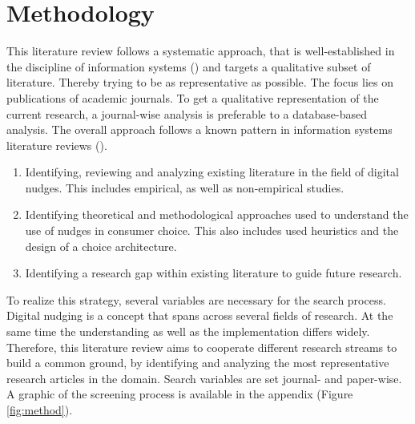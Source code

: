 \section{Methodology}
This literature review follows a systematic approach, that is well-established in the discipline of information systems (\cite{webster_analyzing_2002}) and targets a qualitative subset of literature. Thereby trying to be as representative as possible. The focus lies on publications of academic journals. To get a qualitative representation of the current research, a journal-wise analysis is preferable to a database-based analysis. The overall approach follows a known pattern in information systems literature reviews (\cite{alavi_review_1992}).
\begin{enumerate}
\item Identifying, reviewing and analyzing existing literature in the field of digital nudges. This includes empirical, as well as non-empirical studies.
\item Identifying theoretical and methodological approaches used to understand the use of nudges in consumer choice. This also includes used heuristics and the design of a choice architecture.
\item Identifying a research gap within existing literature to guide future research.
\end{enumerate}

To realize this strategy, several variables are necessary for the search process. Digital nudging is a concept that spans across several fields of research. At the same time the understanding as well as the implementation differs widely. Therefore, this literature review aims to cooperate  different research streams to build a common ground, by identifying and analyzing the most representative research articles in the domain. Search variables are set journal- and paper-wise. A graphic of the screening process is available in the appendix (Figure \ref{fig:method}).

